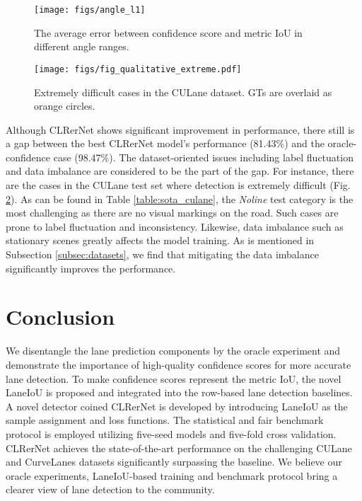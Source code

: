 \documentclass[10pt,twocolumn,letterpaper]{article}
\begin{document}
\begin{figure}[t]
\begin{center}
 \texttt{[image: figs/angle\_l1]}
\end{center}
   \caption{The average  error between confidence score and metric IoU in different angle ranges.}
\label{fig:angle_l1}
\end{figure}


\begin{figure}[t]
\begin{center}
   \texttt{[image: figs/fig\_qualitative\_extreme.pdf]}
  \end{center}
\caption{Extremely difficult cases in the CULane dataset. GTs are overlaid as orange circles.}
\label{fig:qualitative_extreme}
\end{figure}

 Although CLRerNet shows significant improvement in performance, there still is a gap between the best CLRerNet model's performance (81.43\%) and the oracle-confidence case (98.47\%). 
The dataset-oriented issues including label fluctuation and data imbalance are considered to be the part of the gap. 
For instance, there are the cases in the CULane test set where detection is extremely difficult (Fig. \ref{fig:qualitative_extreme}). 
As can be found in Table \ref{table:sota_culane}, the \textit{Noline} test category is the most challenging as there are no visual markings on the road. Such cases are prone to label fluctuation and inconsistency. 
Likewise, data imbalance such as stationary scenes greatly affects the model training. As is mentioned in Subsection \ref{subsec:datasets}, we find that mitigating the data imbalance significantly improves the performance. 
\section{Conclusion}

We disentangle the lane prediction components by the oracle experiment and demonstrate the importance of high-quality confidence scores for more accurate lane detection.
To make confidence scores represent the metric IoU, the novel LaneIoU is proposed and integrated into the row-based lane detection baselines.
A novel detector coined CLRerNet is developed by introducing LaneIoU as the sample assignment and loss functions.
The statistical and fair benchmark protocol is employed utilizing five-seed models and five-fold cross validation.
CLRerNet achieves the state-of-the-art performance on the challenging CULane and CurveLanes datasets significantly surpassing the baseline.
We believe our oracle experiments, LaneIoU-based training and benchmark protocol bring a clearer view of lane detection to the community.
\clearpage
{\small


}
\end{document}
